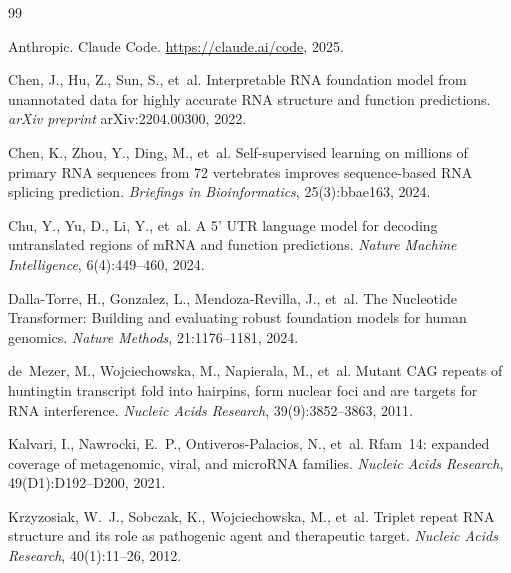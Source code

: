 \documentclass[11pt]{article}
\begin{document}
\begin{thebibliography}{99}

Anthropic.
\newblock Claude Code.
\newblock \url{https://claude.ai/code}, 2025.

Chen, J., Hu, Z., Sun, S., et~al.
\newblock Interpretable {RNA} foundation model from unannotated data for highly
  accurate {RNA} structure and function predictions.
\newblock \emph{arXiv preprint} arXiv:2204.00300, 2022.

Chen, K., Zhou, Y., Ding, M., et~al.
\newblock Self-supervised learning on millions of primary {RNA} sequences from
  72 vertebrates improves sequence-based {RNA} splicing prediction.
\newblock \emph{Briefings in Bioinformatics}, 25(3):bbae163, 2024.

Chu, Y., Yu, D., Li, Y., et~al.
\newblock A 5' {UTR} language model for decoding untranslated regions of {mRNA}
  and function predictions.
\newblock \emph{Nature Machine Intelligence}, 6(4):449--460, 2024.

Dalla-Torre, H., Gonzalez, L., Mendoza-Revilla, J., et~al.
\newblock The Nucleotide Transformer: Building and evaluating robust foundation
  models for human genomics.
\newblock \emph{Nature Methods}, 21:1176--1181, 2024.

de~Mezer, M., Wojciechowska, M., Napierala, M., et~al.
\newblock Mutant CAG repeats of huntingtin transcript fold into hairpins, form
  nuclear foci and are targets for RNA interference.
\newblock \emph{Nucleic Acids Research}, 39(9):3852--3863, 2011.

Kalvari, I., Nawrocki, E.~P., Ontiveros-Palacios, N., et~al.
\newblock Rfam~14: expanded coverage of metagenomic, viral, and {microRNA}
  families.
\newblock \emph{Nucleic Acids Research}, 49(D1):D192--D200, 2021.

Krzyzosiak, W.~J., Sobczak, K., Wojciechowska, M., et~al.
\newblock Triplet repeat RNA structure and its role as pathogenic agent and
  therapeutic target.
\newblock \emph{Nucleic Acids Research}, 40(1):11--26, 2012.


\end{thebibliography}
\end{document}
